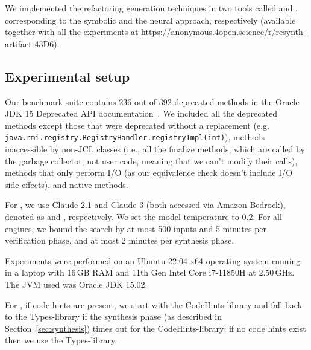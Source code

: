 \documentclass[sigconf,review,anonymous]{acmart}
\begin{document}
We implemented the refactoring generation techniques in two tools called \tool and \llm, corresponding to the symbolic and the neural approach, respectively (available together with all the experiments at \url{https://anonymous.4open.science/r/resynth-artifact-43D6}).

\subsection{Experimental setup}

Our benchmark suite contains 236 out of 392 deprecated methods in the Oracle
JDK 15 Deprecated API documentation~\cite{OracleJdk15DeprecatedAPI}.
We included all the deprecated methods except those that were deprecated without a replacement (e.g. \lstinline[breaklines=true]{java.rmi.registry.RegistryHandler.registryImpl(int)}), 
methods inaccessible by non-JCL classes (i.e., all the finalize methods, which are called by the garbage collector, not user code, meaning that we can't modify their calls), 
methods that only perform I/O (as our equivalence check doesn't include I/O side effects),
and native methods.

For \llm, we use Claude 2.1 and Claude 3 (both accessed via Amazon Bedrock), denoted as \llma and \llmb, respectively. We set the model temperature to $0.2$.
%
For all engines, we bound the search by at most 500 inputs and 5 minutes per verification phase, and at
most 2 minutes per synthesis phase. 

Experiments were performed on an Ubuntu
22.04 x64 operating system running in a laptop with 16\,GB RAM and
11th Gen Intel Core i7-11850H at 2.50\,GHz.  The JVM used was Oracle JDK 15.02.


For \tool, if code hints are present, we start with the CodeHints-library and fall back to the Types-library if the synthesis phase (as described in Section~\ref{sec:synthesis}) times out for the CodeHints-library; if no code hints exist then we use the Types-library.
\end{document}
